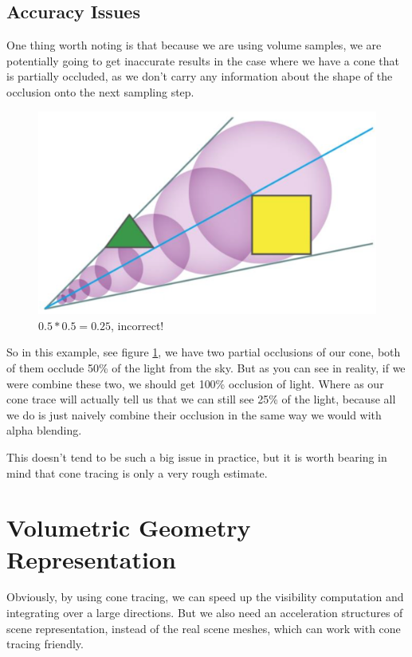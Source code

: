 \subsection{Accuracy Issues}
One thing worth noting is that because we are using volume samples, we are potentially going to get inaccurate results in the case where we have a cone that is partially occluded, as we don't carry any information about the shape of the occlusion onto the next sampling step.

\begin{figure}
	\sidecaption
	\includegraphics[width=.65\textwidth]{graphics/vct/vct-2-3}
	\caption{$0.5*0.5=0.25$, incorrect!}
	\label{f:cone-issues}
\end{figure}

So in this example, see figure \ref{f:cone-issues}, we have two partial occlusions of our cone, both of them occlude 50\% of the light from the sky. But as you can see in reality, if we were combine these two, we should get 100\% occlusion of light. Where as our cone trace will actually tell us that we can still see 25\% of the light, because all we do is just naively combine their occlusion in the same way we would with alpha blending.

This doesn't tend to be such a big issue in practice, but it is worth bearing in mind that cone tracing is only a very rough estimate. 






\section{Volumetric Geometry Representation}
Obviously, by using cone tracing, we can speed up the visibility computation and integrating over a large directions. But we also need an acceleration structures of scene representation, instead of the real scene meshes, which can work with cone tracing friendly. 


